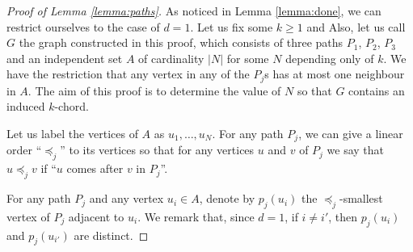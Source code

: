 \documentclass[12pt]{article}
\theoremstyle{definition}
\begin{document}
    \begin{proof}[Proof of Lemma \ref{lemma:paths}]
        As noticed in Lemma \ref{lemma:done},
        we can restrict ourselves to the case
        of $d = 1$. Let us fix some $k \geq 1$ and
        Also, let us call $G$ the graph constructed
        in this proof, which consists 
        of three paths $P_1$, $P_2$, $P_3$ 
        and an independent set $A$ of
        cardinality $\left|N\right|$ for
        some $N$ depending only of $k$.
        We have the restriction that
        any vertex in any of the $P_{j}$s
        has at most one neighbour in $A$.
        The aim of this proof is to
        determine the value of $N$
        so that $G$ contains an induced
        $k$-chord.

        Let us label the vertices of $A$ 
        as $u_1, \ldots, u_{N}$.
        For any path $P_{j}$, we can give
        a linear order ``$\preceq_{j}$''
        to its vertices so that for any
        vertices $u$ and $v$ of $P_{j}$ 
        we say that $u \preceq_{j} v$ 
        if ``$u$ comes after $v$ in $P_{j}$''.
        
        For any path $P_{j}$ and any vertex
        $u_{i} \in A$, denote by $p_{j}\left(u_{i}\right)$ 
        the $\preceq_{j}$-smallest vertex
        of $P_{j}$ adjacent to $u_{i}$.
        We remark that, since $d = 1$,
        if $i \neq i'$, then $p_{j}\left(u_{i}\right)$ 
        and $p_{j}\left(u_{i'}\right)$ 
        are distinct.


\end{proof}
\end{document}
